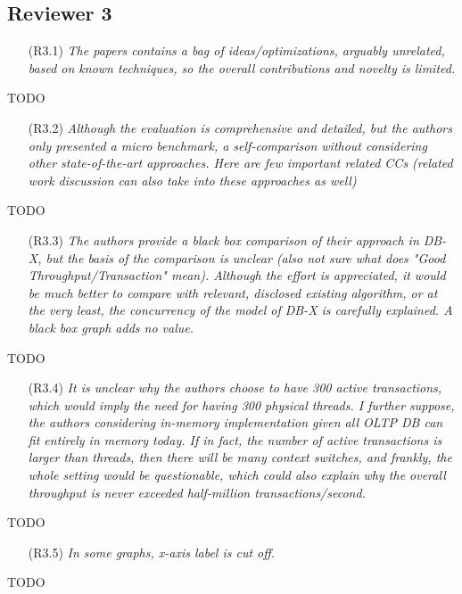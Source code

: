 \documentclass{article}
\newcommand{\changed}[1]{#1}
\newcommand{\changed}[1]{{\color{blue}#1}}
\begin{document}
\subsection{Reviewer 3}

\begin{itemize}
\item[(R3.1)] \emph{The papers contains a bag of ideas/optimizations, arguably unrelated,
	based on known techniques, so the overall contributions and novelty is
	limited.}
\end{itemize}

\changed{
	TODO
}

\begin{itemize}
\item[(R3.2)] \emph{Although the evaluation is comprehensive and detailed, but the authors
	only presented a micro benchmark, a self-comparison without considering
	other state-of-the-art approaches. Here are few important related CCs
	(related work discussion can also take into these approaches as well)}
\end{itemize}

\changed{
	TODO
}

\begin{itemize}
\item[(R3.3)] \emph{The authors provide a black box comparison of their approach in DB-X,
	but the basis of the comparison is unclear (also not sure what does
	"Good Throughput/Transaction" mean). Although the effort is appreciated,
	it would be much better to compare with relevant, disclosed existing
	algorithm, or at the very least, the concurrency of the model of DB-X is
	carefully explained. A black box graph adds no value.}
\end{itemize}

\changed{
	TODO
}


\begin{itemize}
\item[(R3.4)] \emph{It is unclear why the authors choose to have 300 active transactions,
	which would imply the need for having 300 physical threads. I further
	suppose, the authors considering in-memory implementation given all OLTP
	DB can fit entirely in memory today. If in fact, the number of active
	transactions is larger than threads, then there will be many context switches,
	and frankly, the whole setting would be questionable, which could also
	explain why the overall throughput is never exceeded half-million
	transactions/second.}
\end{itemize}

\changed{
	TODO
}

\begin{itemize}
\item[(R3.5)] \emph{In some graphs, x-axis label is cut off.}
\end{itemize}

\changed{
	TODO
}
\end{document}
